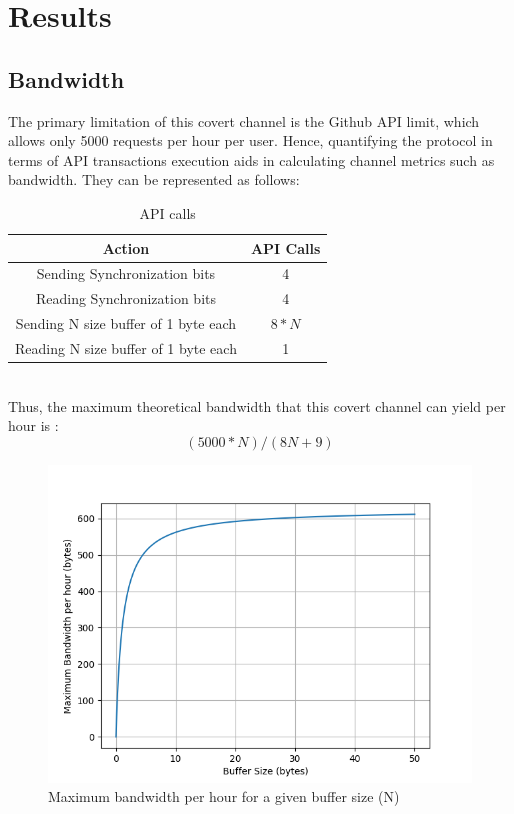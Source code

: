 \documentclass[conference]{IEEEtran}
\begin{document}
\section{Results}
\subsection{Bandwidth}
The primary limitation of this covert channel is the Github API limit, which allows only 5000 requests per hour per user. Hence, quantifying the protocol in terms of API transactions execution aids in calculating channel metrics such as bandwidth. They can be represented as follows:
\begin{table}[htbp]
\caption{API calls}
\begin{center}
\begin{tabular}{|c|c|}
\hline
\textbf{Action} & \textbf{API Calls} \\
\hline
{Sending Synchronization bits} & {4} \\
\hline
{Reading Synchronization bits} & {4} \\
\hline
{Sending N size buffer of 1 byte each} & $$ 8*N $$ \\
\hline
{Reading N size buffer of 1 byte each} & {1} \\
\hline
\end{tabular}
\label{api_call_table}
\end{center}
\end{table}
\\
Thus, the maximum theoretical bandwidth that this covert channel can yield per hour is :  
\begin{equation}
(5000 * N) / (8N + 9)\label{eq}
\end{equation}

\begin{figure}[htp]
    \centering
    \includegraphics[scale=0.50]{images/trinket_plot.png}
    \caption{Maximum bandwidth per hour for a given buffer size (N)}
    \label{fig:buffer_plot}
\end{figure}
\end{document}
